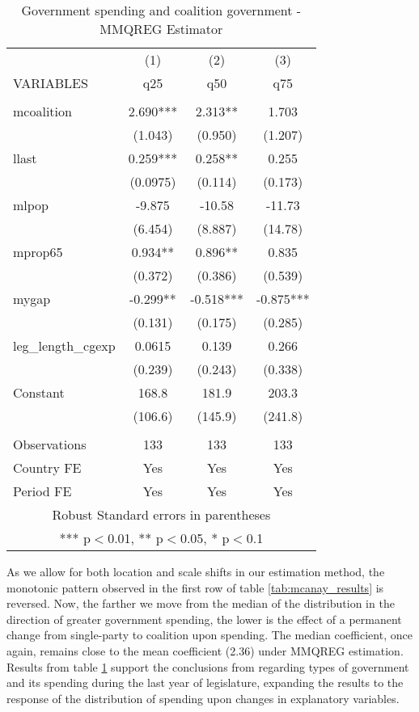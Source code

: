 \documentclass{article}
\begin{document}
\begin{table}[H]
    \centering
    \caption{Government spending and coalition government - MMQREG Estimator}
    \begin{tabular}{lccc}
    &   &   & \\ \hline
     & (1) & (2) & (3) \\
    VARIABLES & q25 & q50 & q75 \\ \hline
     &  &  &  \\
    mcoalition & 2.690*** & 2.313** & 1.703 \\
     & (1.043) & (0.950) & (1.207) \\
    llast & 0.259*** & 0.258** & 0.255 \\
     & (0.0975) & (0.114) & (0.173) \\
    mlpop & -9.875 & -10.58 & -11.73 \\
     & (6.454) & (8.887) & (14.78) \\
    mprop65 & 0.934** & 0.896** & 0.835 \\
     & (0.372) & (0.386) & (0.539) \\
    mygap & -0.299** & -0.518*** & -0.875*** \\
     & (0.131) & (0.175) & (0.285) \\
    leg\_length\_cgexp & 0.0615 & 0.139 & 0.266 \\
     & (0.239) & (0.243) & (0.338) \\
    Constant & 168.8 & 181.9 & 203.3 \\
     & (106.6) & (145.9) & (241.8) \\
     &  &  &  \\
    Observations & 133 & 133 & 133 \\
    Country FE & Yes & Yes & Yes \\
     Period FE & Yes & Yes & Yes \\ \hline
    \multicolumn{4}{c}{ Robust Standard errors in parentheses} \\
    \multicolumn{4}{c}{ *** p$<$0.01, ** p$<$0.05, * p$<$0.1} \\
    \end{tabular}
    \label{tab:mmqreg_results}
\end{table}

As we allow for both location and scale shifts in our estimation method, the monotonic pattern observed in the first row of table \ref{tab:mcanay_results} is reversed. Now, the farther we move from the median of the distribution in the direction of greater government spending, the lower is the effect of a permanent change from single-party to coalition upon spending. The median coefficient, once again, remains close to the mean coefficient (2.36) under MMQREG estimation. Results from table \ref{tab:mmqreg_results} support the conclusions from \cite{persson2007} regarding types of government and its spending during the last year of legislature, expanding the results to the response of the distribution of spending upon changes in explanatory variables.
\end{document}
